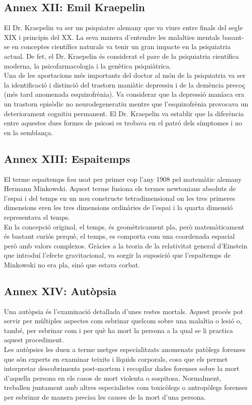 \documentclass[a4paper,12pt]{article}
\begin{document}
\subsection*{Annex XII: Emil Kraepelin}
El Dr. Kraepelin va ser un psiquiatre alemany que va viure entre finals del segle XIX i principis del XX. La seva manera d'entendre les malalties mentals basant-se en conceptes científics naturals va tenir un gran impacte en la psiquiatria actual. De fet, el Dr. Kraepelin és considerat el pare de la psiquiatria científica moderna, la psicofarmacologia i la genètica psiquiàtrica.\\
Una de les aportacions més importants del doctor al món de la psiquiatria va ser la identificació i distinció del trastorn maniàtic depressiu i de la demència precoç (més tard anomenada esquizofrènia). Va considerar que la depressió maníaca era un trastorn episòdic no neurodegeneratiu mentre que l'esquizofrènia provocava un deteriorament cognitiu permanent. El Dr. Kraepelin va establir que la diferència entre aquestes dues formes de psicosi es trobava en el patró dels símptomes i no en la semblança.
\subsection*{Annex XIII: Espaitemps}
El terme espaitemps fou usat per primer cop l'any 1908 pel matemàtic alemany Hermann Minkowski. Aquest terme fusiona els termes newtonians absoluts de l'espai i del temps en un nou constructe tetradimensional on les tres primeres dimensions eren les tres dimensions ordinàries de l'espai i la quarta dimensió representava el temps.\\
En la concepció original, el temps, és geomètricament pla, però matemàticament és bastant curiós perquè, el temps, es comporta com una coordenada espacial però amb valors complexos. Gràcies a la teoria de la relativitat general d'Einstein que introduí l'efecte gravitacional, va sorgir la suposició que l'espaitemps de Minkowski no era pla, sinó que estava corbat.
\subsection*{Annex XIV: Autòpsia}
Una autòpsia és l'examinació detallada d'unes restes mortals. Aquest procés pot servir per múltiples aspectes com esbrinar quelcom sobre una malaltia o lesió o, també, per esbrinar com i per què ha mort la persona a la qual se li practica aquest procediment.\\
Les autòpsies les duen a terme metges especialitzats anomenats patòlegs forenses que són experts en examinar teixits i líquids corporals, cosa que els permet interpretar descobriments post-mortem i recopilar dades forenses sobre la mort d'aquella persona en els casos de mort violenta o sospitosa. Normalment, treballen juntament amb altres especialistes com toxicòlegs o antropòlegs forenses per esbrinar de manera precisa les causes de la mort d'una persona.
\end{document}
